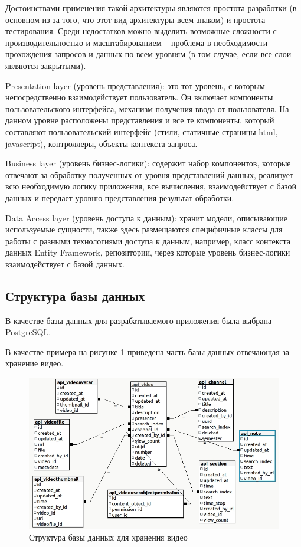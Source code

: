 Достоинствами применения такой архитектуры являются простота разработки
(в основном из-за того, что этот вид архитектуры всем знаком) и простота тестирования.
Среди недостатков можно выделить возможные сложности с производительностью и масштабированием –
проблема в необходимости прохождения запросов и данных по всем уровням
(в том случае, если все слои являются закрытыми).

Presentation layer (уровень представления): это тот уровень, с которым непосредственно
взаимодействует пользователь. Он включает компоненты пользовательского интерфейса, механизм
получения ввода от пользователя. На данном уровне расположены представления и все те компоненты,
который составляют пользовательский интерфейс (стили, статичные страницы html, javascript),
контроллеры, объекты контекста запроса.

Business layer (уровень бизнес-логики): содержит набор компонентов, которые отвечают
за обработку полученных от уровня представлений данных, реализует всю необходимую
логику приложения, все вычисления, взаимодействует с базой данных и передает уровню
представления результат обработки.

Data Access layer (уровень доступа к данным): хранит модели, описывающие используемые сущности,
также здесь размещаются специфичные классы для работы с разными технологиями доступа к данным,
например, класс контекста данных Entity Framework, репозитории, через которые уровень
бизнес-логики взаимодействует с базой данных.

\subsection{Структура базы данных}

В качестве базы данных для разрабатываемого приложения была выбрана PostgreSQL.

В качестве примера на рисунке \ref{db} приведена часть базы данных отвечающая за хранение
видео.

\begin{figure}
  \centering
  \includegraphics[width=1\textwidth]{images/db.jpg}
  \caption{Структура базы данных для хранения видео\label{db}}
\end{figure}


